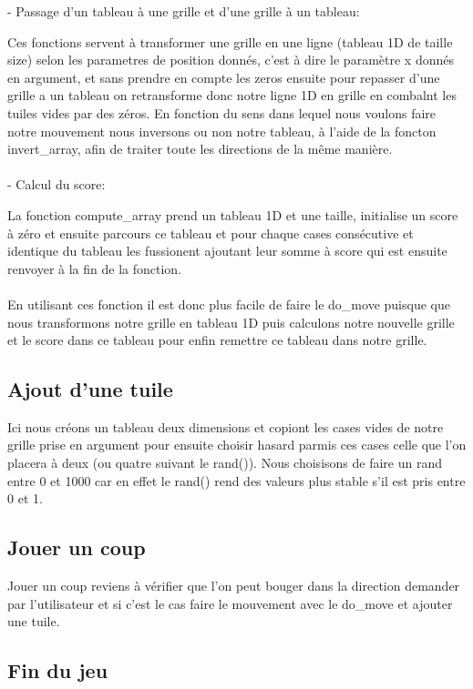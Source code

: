 \documentclass{article}
\begin{document}
- Passage d'un tableau à une grille et d'une grille à un tableau:\par
Ces fonctions servent à transformer une grille en une ligne (tableau 1D de taille size) selon les parametres de position donnés, c'est à dire le paramètre x donnés en argument, et sans prendre en compte les zeros ensuite pour repasser d'une grille a un tableau on retransforme donc notre ligne 1D en grille en combalnt les tuiles vides par des zéros. En fonction du sens dans lequel nous voulons faire notre mouvement nous inversons ou non notre tableau, à l'aide de la foncton invert\_array, afin de traiter toute les directions de la même manière.
\\
\\
- Calcul du score:\par
La fonction compute\_array prend un tableau 1D et une taille, initialise un score à zéro et ensuite parcours ce tableau et pour chaque cases consécutive et identique du tableau les fussionent ajoutant leur somme à score qui est ensuite renvoyer à la fin de la fonction.
\\ \\
En utilisant ces fonction il est donc plus facile de faire le do\_move puisque que nous transformons notre grille en tableau 1D puis calculons notre nouvelle grille et le score dans ce tableau pour enfin remettre ce tableau dans notre grille.

\subsection{Ajout d'une tuile}

Ici nous créons un tableau deux dimensions et copiont les cases vides de notre grille prise en argument pour ensuite choisir hasard parmis ces cases celle que l'on placera à deux (ou quatre suivant le rand()). Nous choisisons de faire un rand entre 0 et 1000 car en effet le rand() rend des valeurs plus stable s'il est pris entre 0 et 1.

\subsection{Jouer un coup}
Jouer un coup reviens à vérifier que l'on peut bouger dans la direction demander par l'utilisateur et si c'est le cas faire le mouvement avec le do\_move et ajouter une tuile.

\subsection{Fin du jeu}
\end{document}
